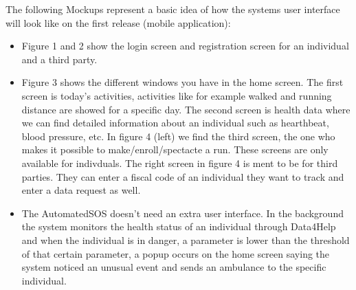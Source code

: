 \documentclass[12pt]{article}
\begin{document}
The following Mockups represent a basic idea of how the systems user interface will look like on the first release (mobile application):
\begin{itemize}
    \item Figure 1 and 2 show the login screen and registration screen for an individual and a third party.
    \item Figure 3 shows the different windows you have in the home screen. The first screen is today's activities, activities like for example walked and running distance are showed for a specific day. The second screen is health data where we can find detailed information about an individual such as hearthbeat, blood pressure, etc. In figure 4 (left) we find the third screen, the one who makes it possible to make/enroll/spectacte a run. These screens are only available for indivduals. The right screen in figure 4 is ment to be for third parties. They can enter a fiscal code of an individual they want to track and enter a data request as well. 
    \item The AutomatedSOS doesn't need an extra user interface. In the background the system monitors  the health status of an individual through Data4Help and when the individual is in danger, a parameter is lower than the threshold of that certain parameter, a popup occurs on the home screen saying the system noticed an unusual event and sends an ambulance to the specific individual.
\end{itemize}
\end{document}
